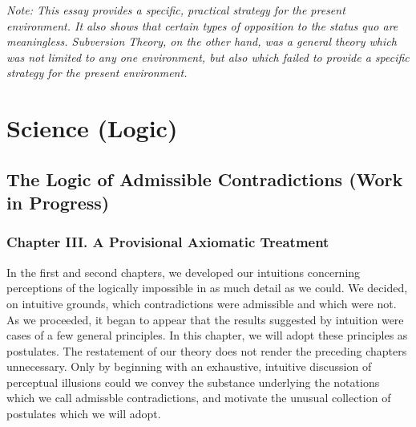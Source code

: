 \documentclass[10pt,twoside,draft]{memoir}
\begin{document}
{{{{{ \itshape
Note: This essay provides a specific, practical strategy for the present 
environment. It also shows that certain types of opposition to the status quo 
are meaningless. Subversion Theory, on the other hand, was a general theory 
which was not limited to any one environment, but also which failed to 
provide a specific strategy for the present environment. \par }


\part{Science (Logic)}

\chapter{The Logic of Admissible Contradictions (Work in Progress)}

\section{Chapter III. A Provisional Axiomatic Treatment}


In the first and second chapters, we developed our intuitions 
concerning perceptions of the logically impossible in as much detail as we 
could. We decided, on intuitive grounds, which contradictions were 
admissible and which were not. As we proceeded, it began to appear that the 
results suggested by intuition were cases of a few general principles. In this 
chapter, we will adopt these principles as postulates. The restatement of our 
theory does not render the preceding chapters unnecessary. Only by 
beginning with an exhaustive, intuitive discussion of perceptual illusions 
could we convey the substance underlying the notations which we call 
admissble contradictions, and motivate the unusual collection of postulates 
which we will adopt. 

}}}}
\end{document}

